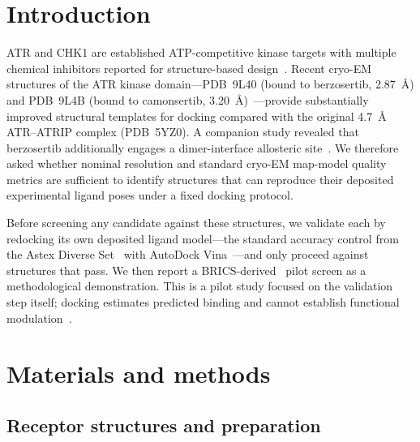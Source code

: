 \documentclass[global,twocolumn]{svjour}
\begin{document}

\section{Introduction}

ATR and CHK1 are established ATP-competitive kinase targets with multiple
chemical inhibitors reported for structure-based
design~\cite{kumagai2006,bass2016,saldivar2017,casper2002,debatisse2012,fokas2012}.
Recent cryo-EM structures of the ATR kinase domain---PDB~9L40 (bound to
berzosertib, 2.87~\AA{}) and PDB~9L4B (bound to camonsertib,
3.20~\AA{})~\cite{wang2025}---provide substantially improved structural
templates for docking compared with the original 4.7~\AA{} ATR--ATRIP complex
(PDB~5YZ0). A companion study revealed that berzosertib additionally engages
a dimer-interface allosteric site~\cite{wang2025}. We therefore asked whether
nominal resolution and standard cryo-EM map-model quality metrics are
sufficient to identify structures that can reproduce their deposited
experimental ligand poses under a fixed docking protocol.

Before screening any candidate against these structures, we validate each by
redocking its own deposited ligand model---the standard accuracy control from
the Astex Diverse Set~\cite{hartshorn2007} with AutoDock
Vina~\cite{trott2010}---and only proceed against structures that pass. We then
report a BRICS-derived~\cite{degen2008} pilot screen as a methodological
demonstration. This is a pilot study focused on the validation step itself;
docking estimates predicted binding and cannot establish functional
modulation~\cite{kumagai2006,bass2016}.

\section{Materials and methods}
\label{sec:methods}

\subsection{Receptor structures and preparation}
\end{document}
